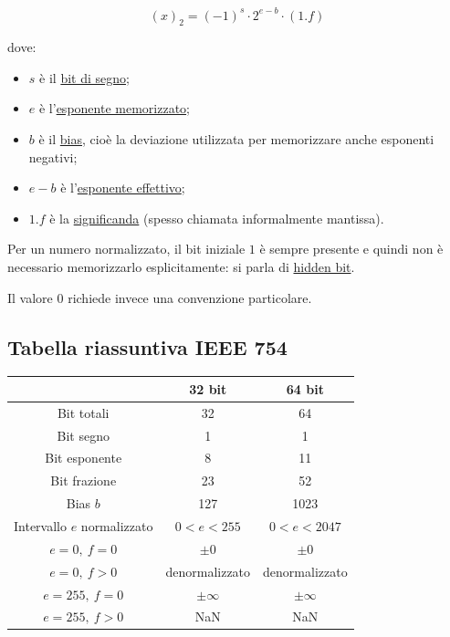 \documentclass{article}
\begin{document}
$$
    (x)_2
    =
    (-1)^s\cdot 2^{e-b}\cdot(1.f)
$$

dove:

\begin{itemize}
    \item $s$ è il \underline{bit di segno};
    \item $e$ è l'\underline{esponente memorizzato};
    \item $b$ è il \underline{bias}, cioè la deviazione utilizzata per memorizzare anche esponenti negativi;
    \item $e-b$ è l'\underline{esponente effettivo};
    \item $1.f$ è la \underline{significanda} (spesso chiamata informalmente mantissa).
\end{itemize}

Per un numero normalizzato, il bit iniziale $1$ è sempre presente e quindi non è necessario memorizzarlo esplicitamente: si parla di \underline{hidden bit}.

Il valore $0$ richiede invece una convenzione particolare.

\subsection{Tabella riassuntiva IEEE 754}

\begin{center}
    \begin{tabular}{|c|c|c|}
        \hline
                                    & \textbf{32 bit} & \textbf{64 bit} \\
        \hline
        Bit totali                  & 32              & 64              \\
        \hline
        Bit segno                   & 1               & 1               \\
        \hline
        Bit esponente               & 8               & 11              \\
        \hline
        Bit frazione                & 23              & 52              \\
        \hline
        Bias $b$                    & 127             & 1023            \\
        \hline
        Intervallo $e$ normalizzato & $0<e<255$       & $0<e<2047$      \\
        \hline
        $e=0,\ f=0$                 & $\pm0$          & $\pm0$          \\
        \hline
        $e=0,\ f>0$                 & denormalizzato  & denormalizzato  \\
        \hline
        $e=255,\ f=0$               & $\pm\infty$     & $\pm\infty$     \\
        \hline
        $e=255,\ f>0$               & NaN             & NaN             \\
        \hline
    \end{tabular}
\end{center}
\end{document}
